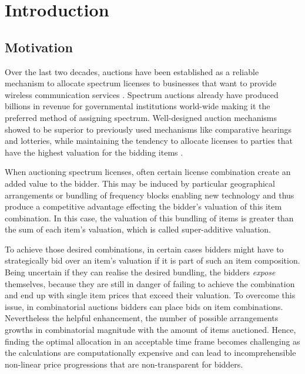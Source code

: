 \graphicspath{{./figures/ch1/}}


\chapter{Introduction}\label{chapter:introduction}

\section{Motivation}
Over the last two decades, auctions have been established as a reliable mechanism to allocate spectrum licenses to businesses that want to provide wireless communication services \cite{Cramton2002}.  Spectrum auctions already have produced billions in revenue for governmental institutions world-wide making it the preferred method of assigning spectrum. Well-designed auction mechanisms showed to be superior to previously used mechanisms like comparative hearings and lotteries, while maintaining the tendency to allocate licenses to parties that have the highest valuation for the bidding items \cite{Cramton2002}. 

When auctioning spectrum licenses, often certain license combination create an added value to the bidder. This may be induced by particular geographical arrangements or bundling of frequency blocks enabling new technology and thus produce a competitive advantage effecting the bidder's valuation of this item combination. In this case, the valuation of this bundling of items is greater than the sum of each item's valuation, which is called super-additive valuation. 

To achieve those desired combinations, in certain cases bidders might have to strategically bid over an item's valuation if it is part of such an item composition. Being uncertain if they can realise the desired bundling, the bidders \textit{expose} themselves, because they are still in danger of failing to achieve the combination and end up with single item prices that exceed their valuation.  
To overcome this issue, in combinatorial auctions bidders can place bids on item combinations. Nevertheless the helpful enhancement, the number of possible arrangements growths in combinatorial magnitude with the amount of items auctioned. Hence, finding the optimal allocation in an acceptable time frame becomes challenging as the calculations are computationally expensive and can lead to incomprehensible non-linear price progressions that are non-transparent for bidders. 


